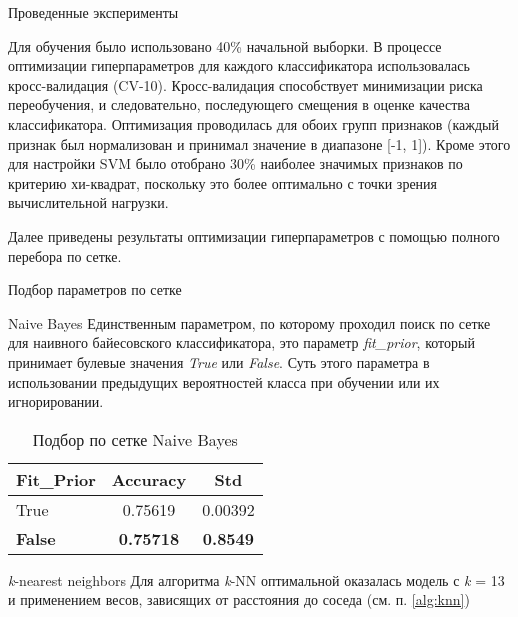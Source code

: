 

\begin{section}{Проведенные эксперименты}

Для обучения было использовано 40\% начальной выборки. В процессе оптимизации гиперпараметров для каждого классификатора использовалась кросс-валидация (CV-10). Кросс-валидация способствует минимизации риска  переобучения, и следовательно, последующего смещения в оценке качества классификатора. Оптимизация проводилась для обоих групп признаков (каждый признак был нормализован и принимал значение в диапазоне [-1, 1]). Кроме этого для настройки SVM было отобрано 30\% наиболее значимых признаков по критерию хи-квадрат, поскольку это более оптимально с точки зрения вычислительной нагрузки.

Далее приведены результаты оптимизации гиперпараметров с помощью полного перебора по сетке.

\begin{subsection}{Подбор параметров по сетке}

\begin{subsubsection}{Naive Bayes}
Единственным параметром, по которому проходил поиск по сетке для наивного байесовского классификатора, это параметр \textit{fit\_prior}, который принимает булевые значения \textit{True} или \textit{False}. Суть этого параметра в использовании предыдущих вероятностей класса при обучении или их игнорировании.

\begin{table}[H]
\centering
{\begin{tabular}{|l|c|c|}
\hline
\textbf{Fit\_Prior} & \textbf{Accuracy} & \textbf{Std} \\
\hline
True & 0.75619  & 0.00392 \\
\hline
\textbf{False} & \textbf{0.75718}  & \textbf{0.8549} \\
\hline
\end{tabular}}

\caption{Подбор по сетке Naive Bayes}
\label{grid:nb}
\end{table}



\end{subsubsection}



\begin{subsubsection}{\textit{k}-nearest neighbors}
  Для алгоритма \textit{k}-NN оптимальной оказалась модель с \textit{k} = 13 и применением весов, зависящих от расстояния до соседа (см. п. \ref{alg:knn})


\end{subsubsection}
\end{subsection}
\end{section}

